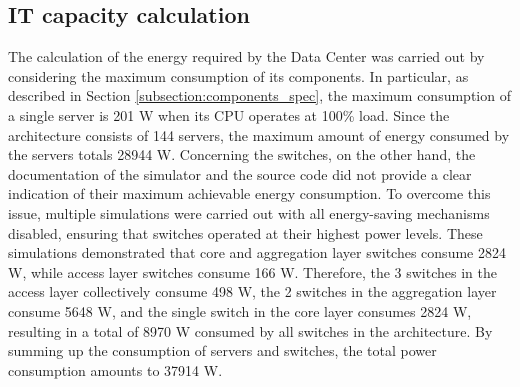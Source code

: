 \subsection{IT capacity calculation} \label{subsection:it_capacity}
The calculation of the energy required by the Data Center was carried out by considering the maximum consumption of its components. In particular, as described in Section \ref{subsection:components_spec}, the maximum consumption of a single server is 201 W when its CPU operates at 100\% load. Since the architecture consists of 144 servers, the maximum amount of energy consumed by the servers totals 28944 W. Concerning the switches, on the other hand, the documentation of the simulator and the source code did not provide a clear indication of their maximum achievable energy consumption. To overcome this issue, multiple simulations were carried out with all energy-saving mechanisms disabled, ensuring that switches operated at their highest power levels. These simulations demonstrated that core and aggregation layer switches consume 2824 W, while access layer switches consume 166 W. Therefore, the 3 switches in the access layer collectively consume 498 W, the 2 switches in the aggregation layer consume 5648 W, and the single switch in the core layer consumes 2824 W, resulting in a total of 8970 W consumed by all switches in the architecture. By summing up the consumption of servers and switches, the total power consumption amounts to 37914 W.


